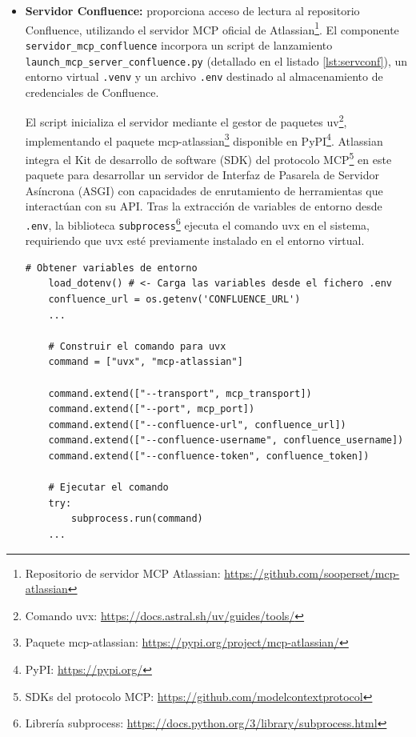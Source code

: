 \begin{itemize}
  \item \textbf{Servidor Confluence:} proporciona acceso de lectura al repositorio Confluence, utilizando el servidor MCP oficial de Atlassian\footnote{Repositorio de servidor MCP Atlassian: \url{https://github.com/sooperset/mcp-atlassian}}. El componente \texttt{servidor\_mcp\_confluence} incorpora un script de lanzamiento \texttt{launch\_mcp\_server\_confluence.py} (detallado en el listado \ref{lst:servconf}), un entorno virtual \texttt{.venv} y un archivo \texttt{.env} destinado al almacenamiento de credenciales de Confluence.

    El script inicializa el servidor mediante el gestor de paquetes uv\footnote{Comando uvx: \url{https://docs.astral.sh/uv/guides/tools/}}, implementando el paquete mcp-atlassian\footnote{Paquete mcp-atlassian: \url{https://pypi.org/project/mcp-atlassian/}} disponible en PyPI\footnote{PyPI: \url{https://pypi.org/}}. Atlassian integra el Kit de desarrollo de software (SDK) del protocolo MCP\footnote{SDKs del protocolo MCP: \url{https://github.com/modelcontextprotocol}} en este paquete para desarrollar un servidor de Interfaz de Pasarela de Servidor Asíncrona (ASGI) con capacidades de enrutamiento de herramientas que interactúan con su API. Tras la extracción de variables de entorno desde \texttt{.env}, la biblioteca \texttt{subprocess}\footnote{Librería subprocess: \url{https://docs.python.org/3/library/subprocess.html}} ejecuta el comando uvx en el sistema, requiriendo que uvx esté previamente instalado en el entorno virtual.
\begin{lstlisting}[caption={\texttt{launch\_mcp\_server\_confluence.py}: ejecución de lanzamiento del servidor MCP Confluence},label={lst:servconf}]
    # Obtener variables de entorno
    load_dotenv() # <- Carga las variables desde el fichero .env
    confluence_url = os.getenv('CONFLUENCE_URL')
    ...

    # Construir el comando para uvx
    command = ["uvx", "mcp-atlassian"]
    
    command.extend(["--transport", mcp_transport])
    command.extend(["--port", mcp_port]) 
    command.extend(["--confluence-url", confluence_url])
    command.extend(["--confluence-username", confluence_username])
    command.extend(["--confluence-token", confluence_token])

    # Ejecutar el comando
    try:
        subprocess.run(command)
    ...
\end{lstlisting}


\end{itemize}
